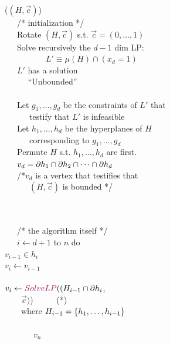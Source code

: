\begin{algorithmEnv}
    \SolveLP{}($(H,\overrightarrow{c})$) \+ \\

~~~/{*} initialization {*}/\\

~~~Rotate $(H,\overrightarrow{c})$ s.t. $\overrightarrow{c}=(0,\ldots,1)$\\

~~~Solve recursively the $d-1$ dim LP: \+ \\
~~~~~~~~~~$L'\equiv\mu(H)\cap(x_{d}=1)$ \-\\

~~~\If $L'$ has a solution \Then{}\+\\
~~~~~ \Return {}``Unbounded''\-\\
~~~\\
~~~Let $g_1,\ldots, g_d$ be the constraints of $L'$ that\\
~~~~~~testify that $L'$ is infeasible\\

~~~Let $h_{1},\ldots,h_{d}$ be the hyperplanes of $H$\\
~~~~~~corresponding to $g_1, \ldots, g_d$\\


~~~Permute $H$ s.t. $h_{1},\ldots,h_{d}$ are first.\\

~~~$v_{d}= {\partial} h_1 \cap {\partial} h_2 \cap \cdots \cap {\partial} h_d$\\
~~~/*$v_d$ is a vertex that testifies that\\
~~~~~~$(H,\overrightarrow{c})$ is bounded */

~~~\\

\\

~~~/{*} the algorithm itself {*}/\\

~~~\For $i\leftarrow d+1$ to $n$ do \+ \\


\If $v_{i-1}\in h_{i}$ \Then \+ \\
$v_{i}\leftarrow v_{i-1}$\-\\
\Else\+\\
$v_{i}\leftarrow \SolveLP{}((H_{i-1}\cap\partial h_{i}$,\\
~~~~$\overrightarrow{c})$) ~~~~~(*)\\
~~~~where $H_{i-1}=\left\{ {h_{1},\ldots,h_{i-1}} \right\}$\-\-\-\\

~~~\\
~~~~~~~\Return $v_{n}$%
\end{algorithmEnv}


